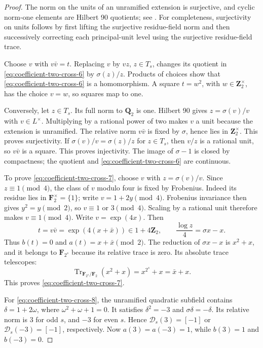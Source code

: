 \begin{proof}
The norm on the units of an unramified extension is
surjective, and cyclic norm-one elements are Hilbert
90 quotients; see \cite[II, Corollary~1.23, p.~67;
III, Proposition~1.2, p.~98]{MilneCFT}.
For completeness, surjectivity on units follows by
first lifting the surjective residue-field norm and
then successively correcting each principal-unit
level using the surjective residue-field trace.

Choose \(v\) with \(v\bar v=t\). Replacing \(v\) by
\(vz\), \(z\in T_s\), changes its quotient in \eqref{eq:coefficient-two-cross-6}
by \(\sigma(z)/z\). Products of choices show that \eqref{eq:coefficient-two-cross-6}
is a homomorphism. A square \(t=w^2\), with
\(w\in\mathbf Z_2^\times\), has the choice \(v=w\),
so squares map to one.

Conversely, let \(z\in T_s\). Its full norm to
\(\mathbf Q_2\) is one. Hilbert 90 gives
\(z=\sigma(v)/v\) with \(v\in L^\times\). Multiplying
by a rational power of two makes \(v\) a unit because
the extension is unramified. The relative norm
\(v\bar v\) is fixed by \(\sigma\), hence lies in
\(\mathbf Z_2^\times\). This proves surjectivity.
If \(\sigma(v)/v=\sigma(z)/z\) for \(z\in T_s\),
then \(v/z\) is a rational unit, so \(v\bar v\) is
a square. This proves injectivity. The image of
\(\sigma-1\) is closed by compactness; the quotient
and \eqref{eq:coefficient-two-cross-6} are continuous.

To prove \eqref{eq:coefficient-two-cross-7}, choose \(v\) with
\(z=\sigma(v)/v\). Since \(z\equiv1\pmod4\), the
class of \(v\) modulo four is fixed by Frobenius.
Indeed its residue lies in \(\mathbf F_2^\times=\{1\}\);
write \(v=1+2y\pmod4\). Frobenius invariance then gives
\(y^2=y\pmod2\), so \(v\equiv1\) or \(3\pmod4\). Scaling by a rational
unit therefore makes \(v\equiv1\pmod4\).
Write \(v=\exp(4x)\). Then
\[
 t=v\bar v=\exp(4(x+\bar x))\in1+4\mathbf Z_2,
 \qquad \frac{\log z}{4}=\sigma x-x.
\]
Thus \(b(t)=0\) and \(a(t)=x+\bar x\pmod2\).
The reduction of \(\sigma x-x\) is \(x^2+x\), and
it belongs to \(\mathbf F_{2^s}\) because its relative
trace is zero. Its absolute trace telescopes:
\[
 \operatorname{Tr}_{\mathbf F_{2^s}/\mathbf F_2}(x^2+x)
                       =x^{2^s}+x=\bar x+x.
\]
This proves \eqref{eq:coefficient-two-cross-7}.

For \eqref{eq:coefficient-two-cross-8}, the unramified quadratic subfield contains
\(\delta=1+2\omega\), where \(\omega^2+\omega+1=0\).
It satisfies \(\delta^2=-3\) and
\(\sigma\delta=-\delta\). Its relative norm is
\(3\) for odd \(s\), and \(-3\) for even \(s\).
Hence \(\mathcal D_s(3)=[-1]\) or
\(\mathcal D_s(-3)=[-1]\), respectively.
Now \(a(3)=a(-3)=1\), while
\(b(3)=1\) and \(b(-3)=0\).


\end{proof}
